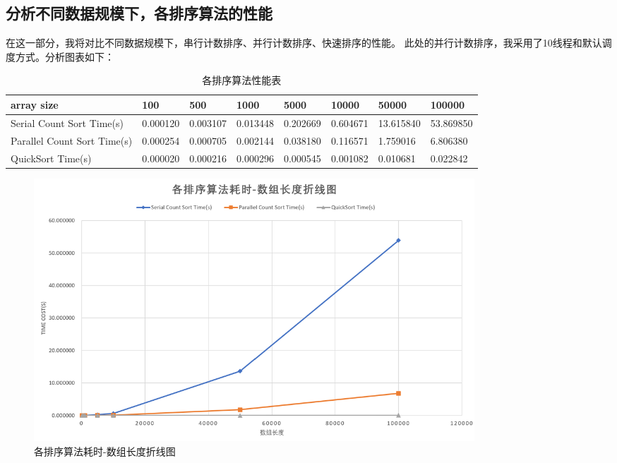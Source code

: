 \documentclass[UTF8]{article}
\begin{document}
\subsection{分析不同数据规模下，各排序算法的性能}
在这一部分，我将对比不同数据规模下，串行计数排序、并行计数排序、快速排序的性能。
此处的并行计数排序，我采用了10线程和默认调度方式。分析图表如下：
\begin{table}[h]
    \caption{各排序算法性能表}
    \label{tab:my-table}
    \centering
    \resizebox{16cm}{!} {
    \begin{tabular}{|l|l|l|l|l|l|l|l|}
    \hline
    array size                  & 100      & 500      & 1000     & 5000     & 10000    & 50000     & 100000    \\ \hline
    Serial Count Sort Time(s)   & 0.000120 & 0.003107 & 0.013448 & 0.202669 & 0.604671 & 13.615840 & 53.869850 \\ \hline
    Parallel Count Sort Time(s) & 0.000254 & 0.000705 & 0.002144 & 0.038180 & 0.116571 & 1.759016  & 6.806380  \\ \hline
    QuickSort Time(s)           & 0.000020 & 0.000216 & 0.000296 & 0.000545 & 0.001082 & 0.010681  & 0.022842  \\ \hline
    \end{tabular}}
    \end{table}
    \begin{figure}[h]
        \label{Ratio}
        \centering
            \includegraphics[width=0.8\textwidth]{sa.png}
            \caption{各排序算法耗时-数组长度折线图}
        \end{figure}
        \begin{table}[h]
            \caption{并行计数排序相较串行计数排序加速比}
            \label{tab:my-table}
            \centering
            \end{table}
\end{document}
